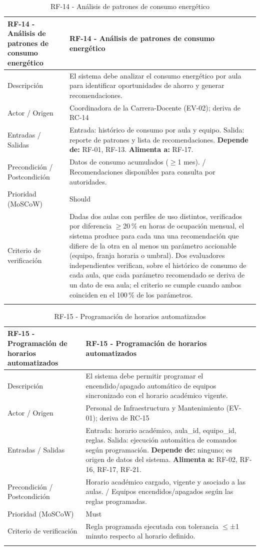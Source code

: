 \begingroup
\small
\begin{longtable}{|P{0.5000}|P{0.5000}|}
\hline
RF-14 - Análisis de patrones de consumo energético & RF-14 - Análisis de patrones de consumo energético \\ \hline
Descripción & El sistema debe analizar el consumo energético por aula para identificar oportunidades de ahorro y generar recomendaciones. \\ \hline
Actor / Origen & Coordinadora de la Carrera-Docente (EV-02); deriva de RC-14 \\ \hline
Entradas / Salidas & Entrada: histórico de consumo por aula y equipo. Salida: reporte de patrones y lista de recomendaciones. \textbf{Depende de:} RF-01, RF-13. \textbf{Alimenta a:} RF-17. \\ \hline
Precondición / Postcondición & Datos de consumo acumulados ($\geq$1 mes). / Recomendaciones disponibles para consulta por autoridades. \\ \hline
Prioridad (MoSCoW) & Should \\ \hline
Criterio de verificación & Dadas dos aulas con perfiles de uso distintos, verificados por diferencia $\geq$20\,\% en horas de ocupación mensual, el sistema produce para cada una una recomendación que difiere de la otra en al menos un parámetro accionable (equipo, franja horaria o umbral). Dos evaluadores independientes verifican, sobre el histórico de consumo de cada aula, que cada parámetro recomendado se deriva de un dato de esa aula; el criterio se cumple cuando ambos coinciden en el 100\,\% de los parámetros. \\ \hline
\caption{RF-14 - Análisis de patrones de consumo energético}
\end{longtable}
\endgroup

\begingroup
\small
\begin{longtable}{|P{0.5000}|P{0.5000}|}
\hline
RF-15 - Programación de horarios automatizados & RF-15 - Programación de horarios automatizados \\ \hline
Descripción & El sistema debe permitir programar el encendido/apagado automático de equipos sincronizado con el horario académico vigente. \\ \hline
Actor / Origen & Personal de Infraestructura y Mantenimiento (EV-01); deriva de RC-15 \\ \hline
Entradas / Salidas & Entrada: horario académico, aula\_id, equipo\_id, reglas. Salida: ejecución automática de comandos según programación. \textbf{Depende de:} ninguno; es origen de datos del sistema. \textbf{Alimenta a:} RF-02, RF-16, RF-17, RF-21. \\ \hline
Precondición / Postcondición & Horario académico cargado, vigente y asociado a las aulas. / Equipos encendidos/apagados según las reglas programadas. \\ \hline
Prioridad (MoSCoW) & Must \\ \hline
Criterio de verificación & Regla programada ejecutada con tolerancia $\leq$±1 minuto respecto al horario definido. \\ \hline
\caption{RF-15 - Programación de horarios automatizados}
\end{longtable}
\endgroup

